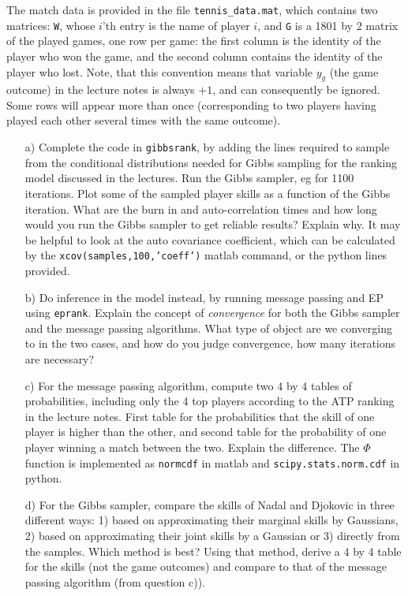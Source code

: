 \documentclass[11pt]{article}
\begin{document}
The match data is provided in the file \texttt{tennis\_data.mat},
which contains two matrices: \texttt{W}, whose $i$'th
entry is the name of player $i$, and \texttt{G} is a 1801 by 2 matrix of
the played games, one row per game: the first column is the identity
of the player who won the game, and the second column contains the
identity of the player who lost. Note, that this convention means that
variable $y_g$ (the game outcome) in the lecture notes is always $+1$,
and can consequently be ignored. Some rows will appear more than once
(corresponding to two players having played each other several times
with the same outcome).
%
\begin{enumerate}

\item[a)] Complete the code in \texttt{gibbsrank}, by adding the lines
  required to sample from the conditional distributions needed for
  Gibbs sampling for the ranking model discussed in the lectures.  Run
  the Gibbs sampler, eg for 1100 iterations. Plot some of the sampled
  player skills as a function of the Gibbs iteration. What are the
  burn in and auto-correlation times and how long would you run the
  Gibbs sampler to get reliable results? Explain why. It may be
  helpful to look at the auto covariance coefficient, which can be
  calculated by the \texttt{xcov(samples,100,'coeff')} matlab command,
  or the python lines provided.

\item[b)] Do inference in the model instead, by running message
  passing and EP using \texttt{eprank}. Explain the concept of
  \emph{convergence} for both the Gibbs sampler and the message
  passing algorithms. What type of object are we converging to in the
  two cases, and how do you judge convergence, how many iterations are
  necessary?
  
\item[c)] For the message passing algorithm, compute two 4 by 4 tables
  of probabilities, including only the 4 top players according to the
  ATP ranking in the lecture notes. First table for the probabilities
  that the skill of one player is higher than the other, and second
  table for the probability of one player winning a match between the
  two. Explain the difference. The $\Phi$ function is implemented as
  \texttt{normcdf} in matlab and \texttt{scipy.stats.norm.cdf} in python.

\item[d)] For the Gibbs sampler, compare the skills of Nadal and
  Djokovic in three different ways: 1) based on approximating their
  marginal skills by Gaussians, 2) based on approximating their joint
  skills by a Gaussian or 3) directly from the samples.
  Which method is best? Using that method, derive a 4 by 4 table
  for the skills (not the game outcomes) and compare to that of the
  message passing algorithm (from question c)).


\end{enumerate}
\end{document}
